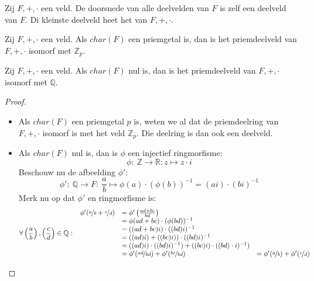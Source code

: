 \documentclass[main.tex]{subfiles}
\begin{document}
\begin{de}
  Zij $F,+,\cdot$ een veld.
  De doorsnede van alle deelvelden van $F$ is zelf een deelveld van $F$.
  Di kleinste deelveld heet het  van $F,+,\cdot$.
\end{de}
\begin{st}
  Zij $F,+,\cdot$ een veld.
  Als $char(F)$ een priemgetal is, dan is het priemdeelveld van $F,+,\cdot$ isomorf met $\mathbb{Z}_{p}$.
\end{st}

\begin{st}
  Zij $F,+,\cdot$ een veld.
  Als $char(F)$ nul is, dan is het priemdeelveld van $F,+,\cdot$ isomorf met $\mathbb{Q}$.

  \begin{proof}
    \begin{itemize}
    \item Als $char(F)$ een priemgetal $p$ is, weten we al dat de priemdeelring van $F,+,\cdot$ isomorf is met het veld $\mathbb{Z}_{p}$.
      Die deelring is dan ook een deelveld.
    \item Als $char(F)$ nul is, dan is $\phi$ een injectief ringmorfisme:
      \[ \phi:\ \mathbb{Z} \rightarrow \mathbb{R}: z \mapsto z\cdot i \]
      Beschouw nu de afbeelding $\phi'$:
      \[ \phi':\ \mathbb{Q} \rightarrow F:\ \frac{a}{b} \mapsto \phi(a) \cdot (\phi(b))^{-1} = (ai) \cdot (bi)^{-1} \]
      Merk nu op dat $\phi'$ en ringmorfisme is:
      \[
      \forall \left(\frac{a}{b}\right),\left(\frac{c}{d}\right) \in
      \mathbb{Q}:\
      \begin{array}{rll}
        \phi'(\nicefrac{a}{b} + \nicefrac{c}{d}) &=  \phi'\left(\frac{ad+bc}{bd}\right) &\\
                                                 &= \phi(ad+bc) \cdot (\phi(bd))^{-1} &\\
                                                 &= ((ad+bc)i) \cdot ((bd)i)^{-1} &\\
                                                 &= ((ad)i) + ((bc)i)) \cdot ((bd)i)^{-1} &\\
                                                 &= ((ad)i)\cdot ((bd)i)^{-1}) +  ((bc)i) \cdot ((bd)\cdot i)^{-1}) &\\
                                                 &= \phi'(\nicefrac{ad}{bd}) + \phi'(\nicefrac{bc}{bd}) &= \phi'(\nicefrac{a}{b}) + \phi'(\nicefrac{c}{d}) \\
      \end{array}
\]
\end{itemize}
\end{proof}
\end{st}
\end{document}
